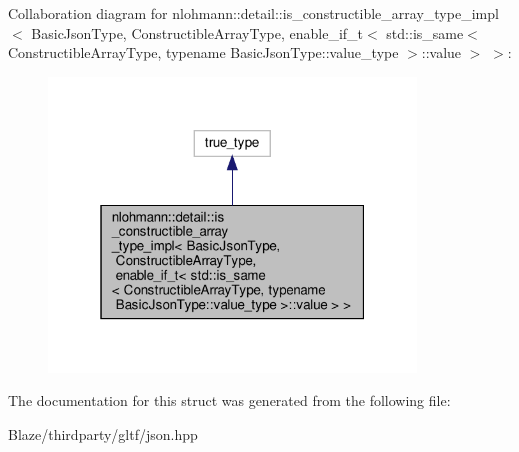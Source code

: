 Collaboration diagram for nlohmann\+:\+:detail\+:\+:is\+\_\+constructible\+\_\+array\+\_\+type\+\_\+impl$<$ Basic\+Json\+Type, Constructible\+Array\+Type, enable\+\_\+if\+\_\+t$<$ std\+:\+:is\+\_\+same$<$ Constructible\+Array\+Type, typename Basic\+Json\+Type\+:\+:value\+\_\+type $>$\+:\+:value $>$ $>$\+:\nopagebreak
\begin{figure}[H]
\begin{center}
\leavevmode
\includegraphics[width=277pt]{structnlohmann_1_1detail_1_1is__constructible__array__type__impl_3_01BasicJsonType_00_01Construc32e1f7176d4f9ce923e40e0b0d186e13}
\end{center}
\end{figure}


The documentation for this struct was generated from the following file\+:\begin{DoxyCompactItemize}
\item 
Blaze/thirdparty/gltf/json.\+hpp\end{DoxyCompactItemize}
